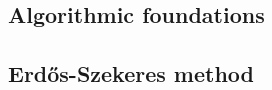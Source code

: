 
\begin{lemma}
  \label{lem:taylor-nonneg}
\end{lemma}

\subsection{Algorithmic foundations}




\subsection{Erdős-Szekeres method}


